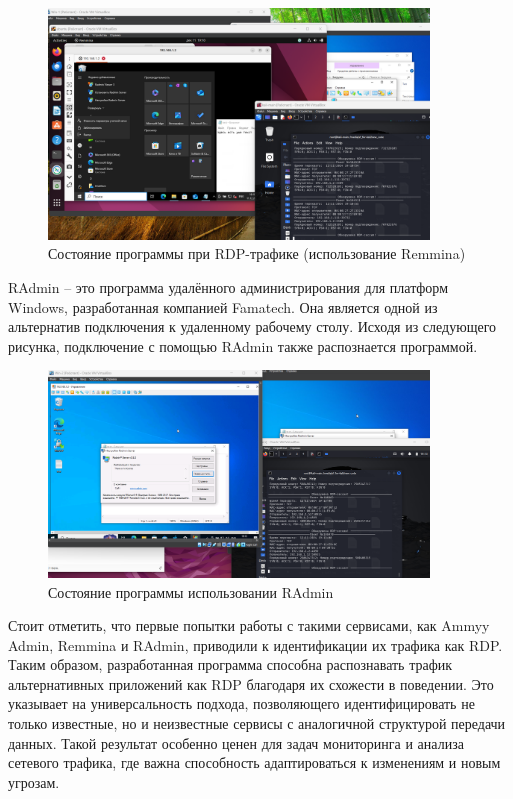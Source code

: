 \documentclass[bachelor, och, coursework]{SCWorks}
\begin{document}
\begin{figure}[H]
  \centering
  \includegraphics[width=0.9\textwidth]{pics/10remmina.png}
  \caption{Состояние программы при RDP-трафике (использование Remmina)}
  \label{remmina1}
\end{figure}


RAdmin -- это программа удалённого администрирования для платформ Windows, разработанная компанией Famatech. Она 
является одной из альтернатив подключения к удаленному рабочему столу. Исходя из следующего рисунка, подключение с помощью RAdmin
также распознается программой.


\begin{figure}[H]
  \centering
  \includegraphics[width=0.9\textwidth]{pics/11radmin.png}
  \caption{Состояние программы использовании RAdmin}
  \label{radmin1}
\end{figure}

Стоит отметить, что первые попытки работы с такими сервисами, как Ammyy Admin, Remmina и RAdmin, приводили к 
идентификации их трафика как RDP. Таким образом, разработанная программа способна распознавать трафик альтернативных 
приложений как RDP благодаря их схожести в поведении. Это указывает на универсальность подхода, позволяющего 
идентифицировать не только известные, но и неизвестные сервисы с аналогичной структурой передачи данных. 
Такой результат особенно ценен для задач мониторинга и анализа сетевого трафика, где важна способность 
адаптироваться к изменениям и новым угрозам.
\end{document}
